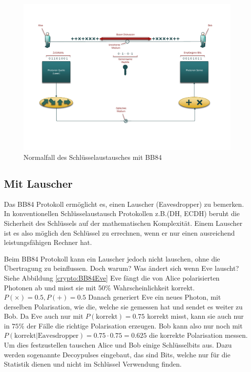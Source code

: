   \begin{figure}
    \centering
    \includegraphics[height=0.45\textheight]{crypto/BB84.pdf}
    \caption{Normalfall des Schl\"usselaustausches mit BB84\label{crypto:BB84KE}}
  \end{figure}

  \subsection{Mit Lauscher}
  Das BB84 Protokoll erm\"oglicht es, einen Lauscher (Eavesdropper) zu bemerken.
  In konventionellen Schl\"usselaustausch Protokollen z.B.(DH, ECDH)
  beruht die Sicherheit des Schl\"ussels auf der mathematischen Komplexit\"at.
  Einem Lauscher ist es also m\"oglich den Schl\"ussel zu errechnen,
  wenn er nur einen ausreichend leistungsf\"ahigen Rechner hat.

  Beim BB84 Protokoll kann ein Lauscher jedoch nicht lauschen, ohne die \"Ubertragung zu beinflussen.
  Doch warum? Was \"andert sich wenn Eve lauscht? Siehe Abbildung \ref{crypto:BB84Eve}
  Eve f\"angt die von Alice polarisierten Photonen ab und misst sie mit 50\% Wahrscheinlichkeit korrekt.
  $P(\times)=0.5, P(+)=0.5$
  Danach generiert Eve ein neues Photon, mit derselben Polarisation,
  wie die, welche sie gemessen hat und sendet es weiter zu Bob.
  Da Eve auch nur mit
  $P(\text{korrekt})=0.75$
  korrekt misst, kann sie auch nur in
  $75\%$
  der F\"alle die richtige Polarisation erzeugen.
  Bob kann also nur noch mit
  $P(\text{korrekt}|\text{Eavesdropper})=0.75\cdot 0.75=0.625$
  die korrekte Polarisation messen.
  Um dies festzustellen tauschen Alice und Bob einige Schl\"usselbits aus.
  Dazu werden sogenannte Decoypulses eingebaut, das sind Bits,
  welche nur f\"ur die Statistik dienen und nicht im Schl\"ussel Verwendung finden.

